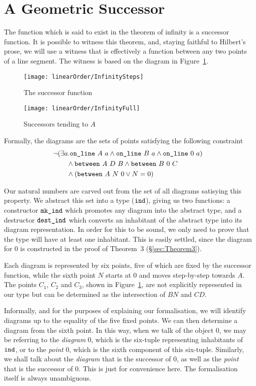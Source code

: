 \section{A Geometric Successor}
The function which is said to exist in the theorem of infinity is a successor function. It is possible to  witness this theorem, and, staying faithful to Hilbert's prose, we will use a witness that is effectively a function between any two points of a line segment. The witness is based on the diagram in Figure~\ref{fig:successor}.

\begin{figure}
\centering\texttt{[image: linearOrder/InfinitySteps]}
\caption{The successor function}
\label{fig:successor}
\end{figure}

\begin{figure}
\centering\texttt{[image: linearOrder/InfinityFull]}
\caption{Successors tending to $A$}
\label{fig:FullSuccessor}
\end{figure}

Formally, the diagrams are the sets of points satisfying the following constraint
\begin{align}
&\neg(\exists a.\texttt{on\_line}\ A\ a\wedge \texttt{on\_line}\ B\ a\wedge \texttt{on\_line}\ 0\ a) \label{theorem:IndConstraint}\\
&\qquad\wedge \texttt{between}\ A\ D\ B \wedge \texttt{between}\ B\ 0\ C\notag\\
&\qquad\wedge (\texttt{between}\ A\ N\ 0 \vee N = 0)\notag
\end{align}

Our natural numbers are carved out from the set of all diagrams satisying this property. We abstract this set into a type ($\texttt{ind}$), giving us two functions: a constructor $\texttt{mk\_ind}$ which promotes any diagram into the abstract type, and a destructor $\texttt{dest\_ind}$ which converts an inhabitant of the abstract type into its diagram representation. In order for this to be sound, we only need to prove that the type will have at least one inhabitant. This is easily settled, since the diagram for $0$ is constructed in the proof of Theorem~3 (\S\ref{sec:Theorem3}). 

Each diagram is represented by six points, five of which are fixed by the successor function, while the sixth point $N$ starts at $0$ and moves step-by-step towards $A$. The points $C_1$, $C_2$ and $C_3$, shown in Figure~\ref{fig:successor}, are not explicitly represented in our type but can be determined as the intersection of $BN$ and $CD$.

Informally, and for the purposes of explaining our formalisation, we will identify diagrams up to the equality of the five fixed points. We can then determine a diagram from the sixth point. In this way, when we talk of the object $0$, we may be referring to the \emph{diagram} 0, which is the six-tuple representing inhabitants of $\texttt{ind}$, or to the \emph{point} 0, which is the sixth component of this six-tuple. Similarly, we shall talk about the \emph{diagram} that is the successor of 0, as well as the \emph{point} that is the successor of 0. This is just for convenience here. The formalisation itself is always unambiguous.

